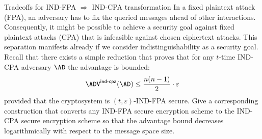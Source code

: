 \documentclass{crypto-exercise}
\author{Sven Laur}
\begin{document}
\begin{exercise}{Tradeoffs for IND-FPA $\Rightarrow$ IND-CPA transformation}
In a fixed plaintext attack (FPA), an adversary has to fix the queried messages ahead of other interactions. Consequently, it might be possible to achieve a security goal against fixed plaintext attacks (CPA) that is infeasible against chosen ciphertext attacks. This separation manifests already if we consider indistinguishability as a security goal. Recall that there exists a simple reduction that proves that for any $t$-time IND-CPA adversary $\AD$ the advantage is bounded:
\begin{align*}
\advINDCPAXX{}{\AD}\leq \frac{n(n-1)}{2}\cdot\varepsilon
\end{align*}
provided that the cryptosystem is $(t,\varepsilon)$-IND-FPA secure. Give a corresponding construction that converts any IND-FPA
secure encryption scheme to the IND-CPA secure encryption scheme so that the advantage bound decreases logarithmically with respect to the message space size. 
\end{exercise}
\end{document}
